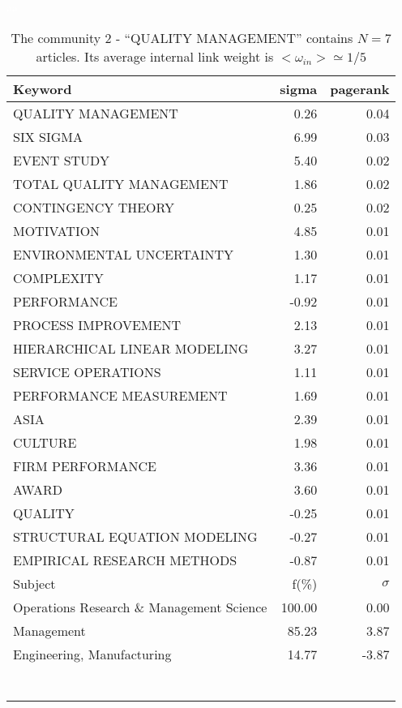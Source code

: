 \documentclass[a4paper,11pt]{report}
\begin{document}
\begin{landscape}
\clearpage

\begin{table}[!ht]
\caption{The community 2 - ``QUALITY MANAGEMENT'' contains $N = 7$ articles. Its average internal link weight is $<\omega_{in}> \simeq 1/5$ }
\textcolor{white}{aa}\\
{\scriptsize\begin{tabular}{|l r  r|}
\hline
Keyword & sigma & pagerank \\
\hline
QUALITY MANAGEMENT & 0.26 & 0.04\\
SIX SIGMA & 6.99 & 0.03\\
EVENT STUDY & 5.40 & 0.02\\
TOTAL QUALITY MANAGEMENT & 1.86 & 0.02\\
CONTINGENCY THEORY & 0.25 & 0.02\\
MOTIVATION & 4.85 & 0.01\\
ENVIRONMENTAL UNCERTAINTY & 1.30 & 0.01\\
COMPLEXITY & 1.17 & 0.01\\
PERFORMANCE & -0.92 & 0.01\\
PROCESS IMPROVEMENT & 2.13 & 0.01\\
HIERARCHICAL LINEAR MODELING & 3.27 & 0.01\\
SERVICE OPERATIONS & 1.11 & 0.01\\
PERFORMANCE MEASUREMENT & 1.69 & 0.01\\
ASIA & 2.39 & 0.01\\
CULTURE & 1.98 & 0.01\\
FIRM PERFORMANCE & 3.36 & 0.01\\
AWARD & 3.60 & 0.01\\
QUALITY & -0.25 & 0.01\\
STRUCTURAL EQUATION MODELING & -0.27 & 0.01\\
EMPIRICAL RESEARCH METHODS & -0.87 & 0.01\\
\hline
\hline
Subject & f(\%) & $\sigma$\\
\hline
Operations Research \& Management Science & 100.00 & 0.00\\
Management & 85.23 & 3.87\\
Engineering, Manufacturing & 14.77 & -3.87\\
 &  & \\
 &  & \\
 &  & \\
 &  & \\
 &  & \\
 &  & \\
 &  & \\

\end{tabular}}
\end{table}
\end{landscape}
\end{document}
